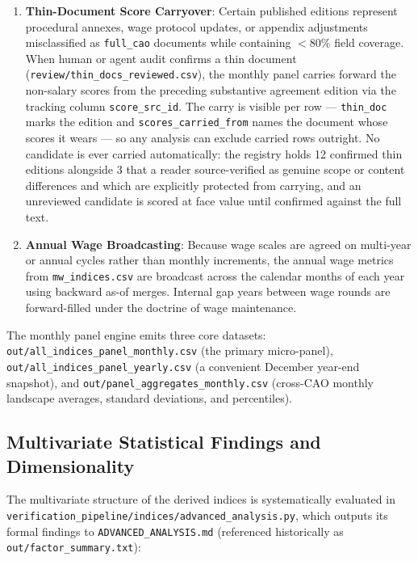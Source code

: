 \begin{enumerate}[leftmargin=1.8em]
  \item \textbf{Thin-Document Score Carryover}:
    Certain published editions represent procedural annexes, wage protocol updates, or appendix adjustments misclassified as \nolinkurl{full_cao} documents while containing $<80\%$ field coverage. When human or agent audit confirms a thin document (\nolinkurl{review/thin_docs_reviewed.csv}), the monthly panel carries forward the non-salary scores from the preceding substantive agreement edition via the tracking column \nolinkurl{score_src_id}. The carry is visible per row --- \nolinkurl{thin_doc} marks the edition and \nolinkurl{scores_carried_from} names the document whose scores it wears --- so any analysis can exclude carried rows outright. No candidate is ever carried automatically: the registry holds 12 confirmed thin editions alongside 3 that a reader source-verified as genuine scope or content differences and which are explicitly protected from carrying, and an unreviewed candidate is scored at face value until confirmed against the full text.

  \item \textbf{Annual Wage Broadcasting}:
    Because wage scales are agreed on multi-year or annual cycles rather than monthly increments, the annual wage metrics from \nolinkurl{mw_indices.csv} are broadcast across the calendar months of each year using backward as-of merges. Internal gap years between wage rounds are forward-filled under the doctrine of wage maintenance.
\end{enumerate}

The monthly panel engine emits three core datasets: \nolinkurl{out/all_indices_panel_monthly.csv} (the primary micro-panel), \nolinkurl{out/all_indices_panel_yearly.csv} (a convenient December year-end snapshot), and \nolinkurl{out/panel_aggregates_monthly.csv} (cross-CAO monthly landscape averages, standard deviations, and percentiles).

\subsection{Multivariate Statistical Findings and Dimensionality}
\label{sec:factor_findings}

The multivariate structure of the derived indices is systematically evaluated in \nolinkurl{verification_pipeline/indices/advanced_analysis.py}, which outputs its formal findings to \nolinkurl{ADVANCED_ANALYSIS.md} (referenced historically as \nolinkurl{out/factor_summary.txt}):

